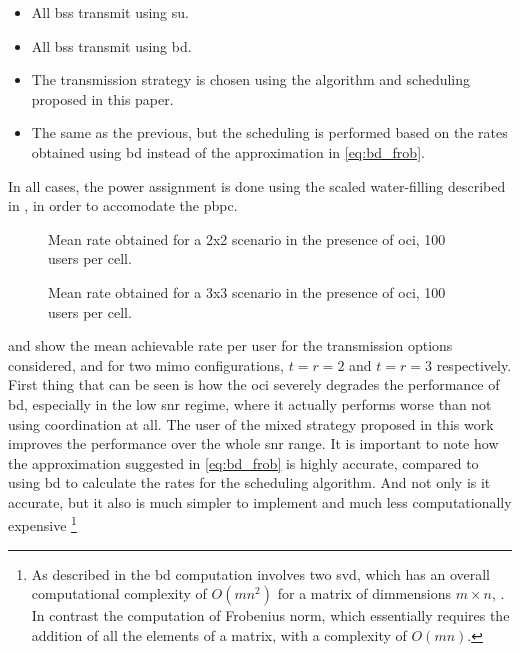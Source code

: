 \begin{itemize}
    \item All \glspl{bs} transmit using \gls{su}.
    \item All \glspl{bs} transmit using \gls{bd}.
    \item The transmission strategy is chosen using the algorithm and scheduling
        proposed in this paper.
    \item The same as the previous, but the scheduling is performed based on the
        rates obtained using \gls{bd} instead of the approximation in
        \eqref{eq:bd_frob}.
\end{itemize}

In all cases, the power assignment is done using the scaled water-filling
described in , in order to accomodate the \gls{pbpc}.

\begin{figure}[t]
    \centering
    \begin{minipage}[t]{0.7\textwidth}
        
    \end{minipage}
\caption{Mean rate obtained for a 2x2 scenario in the presence of \gls{oci}, 100
users per cell.}
\label{fig:mean_rate_2x2}
\end{figure}

\begin{figure}[t]
    \centering
    \begin{minipage}[t]{0.7\textwidth}
        
    \end{minipage}
\caption{Mean rate obtained for a 3x3 scenario in the presence of \gls{oci}, 100
users per cell.}
\label{fig:mean_rate_3x3}
\end{figure}

 and  show the mean achievable
rate per user for the transmission options considered, and for two \gls{mimo}
configurations, $t=r=2$ and $t=r=3$ respectively. First thing that can be seen
is how the \gls{oci} severely degrades the performance of \gls{bd}, especially
in the low \gls{snr} regime, where it actually performs worse than not using
coordination at all. The user of the mixed strategy proposed in this work
improves the performance over the whole \gls{snr} range. It is important to note
how the approximation suggested in \eqref{eq:bd_frob} is highly accurate,
compared to using \gls{bd} to calculate the rates for the scheduling algorithm.
And not only is it accurate, but it also is much simpler to implement and much
less computationally expensive
\footnote{As described in  the \gls{bd} computation
involves two \gls{svd}, which has an overall computational complexity of
$O\left(mn^2\right)$ for a matrix of dimmensions $m \times n$,
\cite{golub2012matrix}. In contrast the computation of Frobenius norm, which
essentially requires the addition of all the elements of a matrix, with a
complexity of $O\left(mn\right)$.}

